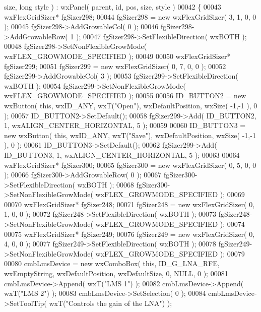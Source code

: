 \begin{DoxyCode}
      size, \textcolor{keywordtype}{long} style ) : wxPanel( parent, id, pos, size, style )
00042 \{
00043     wxFlexGridSizer* fgSizer298;
00044     fgSizer298 = \textcolor{keyword}{new} wxFlexGridSizer( 3, 1, 0, 0 );
00045     fgSizer298->AddGrowableCol( 0 );
00046     fgSizer298->AddGrowableRow( 1 );
00047     fgSizer298->SetFlexibleDirection( wxBOTH );
00048     fgSizer298->SetNonFlexibleGrowMode( wxFLEX\_GROWMODE\_SPECIFIED );
00049     
00050     wxFlexGridSizer* fgSizer299;
00051     fgSizer299 = \textcolor{keyword}{new} wxFlexGridSizer( 0, 7, 0, 0 );
00052     fgSizer299->AddGrowableCol( 3 );
00053     fgSizer299->SetFlexibleDirection( wxBOTH );
00054     fgSizer299->SetNonFlexibleGrowMode( wxFLEX\_GROWMODE\_SPECIFIED );
00055     
00056     ID_BUTTON2 = \textcolor{keyword}{new} wxButton( \textcolor{keyword}{this}, wxID\_ANY, wxT(\textcolor{stringliteral}{"Open"}), wxDefaultPosition, wxSize( -1,-1 ), 0 );
00057     ID_BUTTON2->SetDefault(); 
00058     fgSizer299->Add( ID_BUTTON2, 1, wxALIGN\_CENTER\_HORIZONTAL, 5 );
00059     
00060     ID_BUTTON3 = \textcolor{keyword}{new} wxButton( \textcolor{keyword}{this}, wxID\_ANY, wxT(\textcolor{stringliteral}{"Save"}), wxDefaultPosition, wxSize( -1,-1 ), 0 );
00061     ID_BUTTON3->SetDefault(); 
00062     fgSizer299->Add( ID_BUTTON3, 1, wxALIGN\_CENTER\_HORIZONTAL, 5 );
00063     
00064     wxFlexGridSizer* fgSizer300;
00065     fgSizer300 = \textcolor{keyword}{new} wxFlexGridSizer( 0, 5, 0, 0 );
00066     fgSizer300->AddGrowableRow( 0 );
00067     fgSizer300->SetFlexibleDirection( wxBOTH );
00068     fgSizer300->SetNonFlexibleGrowMode( wxFLEX\_GROWMODE\_SPECIFIED );
00069     
00070     wxFlexGridSizer* fgSizer248;
00071     fgSizer248 = \textcolor{keyword}{new} wxFlexGridSizer( 0, 1, 0, 0 );
00072     fgSizer248->SetFlexibleDirection( wxBOTH );
00073     fgSizer248->SetNonFlexibleGrowMode( wxFLEX\_GROWMODE\_SPECIFIED );
00074     
00075     wxFlexGridSizer* fgSizer249;
00076     fgSizer249 = \textcolor{keyword}{new} wxFlexGridSizer( 0, 4, 0, 0 );
00077     fgSizer249->SetFlexibleDirection( wxBOTH );
00078     fgSizer249->SetNonFlexibleGrowMode( wxFLEX\_GROWMODE\_SPECIFIED );
00079     
00080     cmbLmsDevice = \textcolor{keyword}{new} wxComboBox( \textcolor{keyword}{this}, ID_G_LNA_RFE, wxEmptyString, wxDefaultPosition, wxDefaultSize, 0, 
      NULL, 0 );
00081     cmbLmsDevice->Append( wxT(\textcolor{stringliteral}{"LMS 1"}) );
00082     cmbLmsDevice->Append( wxT(\textcolor{stringliteral}{"LMS 2"}) );
00083     cmbLmsDevice->SetSelection( 0 );
00084     cmbLmsDevice->SetToolTip( wxT(\textcolor{stringliteral}{"Controls the gain of the LNA"}) );

\end{DoxyCode}
